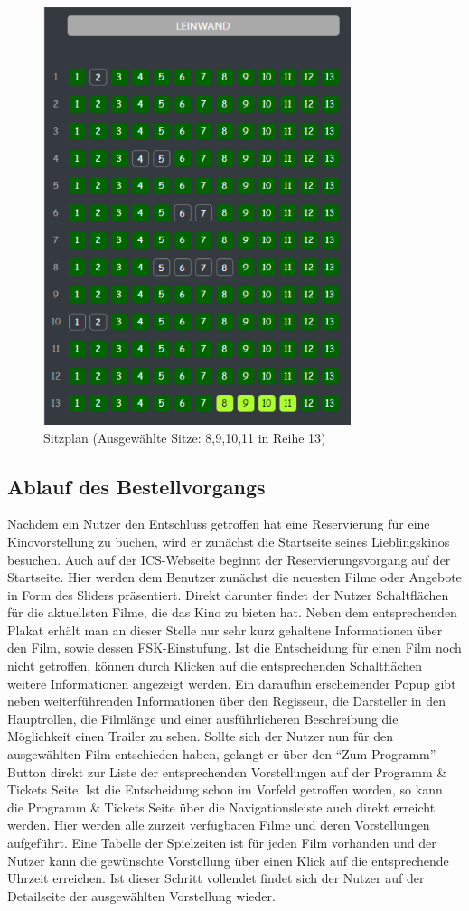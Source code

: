 	\begin{figure}[H]
		\centering 
		\includegraphics[width=9cm]{img/sitzplan.png}
		\captionsetup{format=hang}
		\caption[Sitzplan]{\label{fig:sitzplan} Sitzplan (Ausgewählte Sitze: 8,9,10,11 in Reihe 13)}
	\end{figure}

	\subsection{Ablauf des Bestellvorgangs}
	Nachdem ein Nutzer den Entschluss getroffen hat eine Reservierung für eine Kinovorstellung zu buchen, wird er zunächst die Startseite seines Lieblingskinos besuchen. Auch auf der ICS-Webseite beginnt der Reservierungsvorgang auf der Startseite. Hier werden dem Benutzer zunächst die neuesten Filme oder Angebote in Form des Sliders präsentiert. Direkt darunter findet der Nutzer Schaltflächen für die aktuellsten Filme, die das Kino zu bieten hat. Neben dem entsprechenden Plakat erhält man an dieser Stelle nur sehr kurz gehaltene Informationen über den Film, sowie dessen FSK-Einstufung. Ist die Entscheidung für einen Film noch nicht getroffen, können durch Klicken auf die entsprechenden Schaltflächen weitere Informationen angezeigt werden. Ein daraufhin erscheinender Popup gibt neben weiterführenden Informationen über den Regisseur, die Darsteller in den Hauptrollen, die Filmlänge und einer ausführlicheren Beschreibung die Möglichkeit einen Trailer zu sehen. Sollte sich der Nutzer nun für den ausgewählten Film entschieden haben, gelangt er über den \enquote{Zum Programm} Button direkt zur Liste der entsprechenden Vorstellungen auf der Programm \& Tickets Seite. Ist die Entscheidung schon im Vorfeld getroffen worden, so kann die Programm \& Tickets Seite über die Navigationsleiste auch direkt erreicht werden. Hier werden alle zurzeit verfügbaren Filme und deren Vorstellungen aufgeführt. Eine Tabelle der Spielzeiten ist für jeden Film vorhanden und der Nutzer kann die gewünschte Vorstellung über einen Klick auf die entsprechende Uhrzeit erreichen. Ist dieser Schritt vollendet findet sich der Nutzer auf der Detailseite der ausgewählten Vorstellung wieder. 
	
